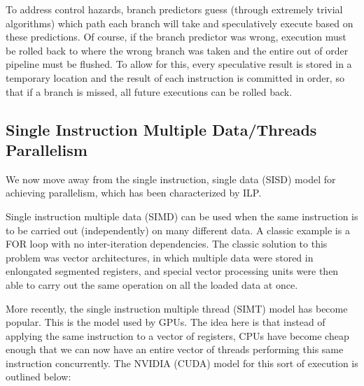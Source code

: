 \documentclass[12pt]{article}
\begin{document}
To address control hazards, branch predictors guess (through extremely trivial
algorithms) which path each branch will take and speculatively execute based 
on these predictions.
Of course, if the branch predictor was wrong, execution must be rolled back
to where the wrong branch was taken and the entire out of order pipeline must 
be flushed.
To allow for this, every speculative result is stored in a temporary location
and the result of each instruction is committed in order, so that if a branch
is missed, all future executions can be rolled back.

\subsection*{Single Instruction Multiple Data/Threads Parallelism}

We now move away from the single instruction, single data (SISD) model for
achieving parallelism, which has been characterized by ILP.

Single instruction multiple data (SIMD) can be used when the same instruction
is to be carried out (independently) on many different data.
A classic example is a FOR loop with no inter-iteration dependencies.
The classic solution to this problem was vector architectures, in which 
multiple data were stored in enlongated segmented registers, and special
vector processing units were then able to carry out the same operation on
all the loaded data at once.

More recently, the single instruction multiple thread (SIMT) model has become
popular.
This is the model used by GPUs.
The idea here is that instead of applying the same instruction to a vector of
registers, CPUs have become cheap enough that we can now have an entire vector
of threads performing this same instruction concurrently.
The NVIDIA (CUDA) model for this sort of execution is outlined below:
\end{document}
